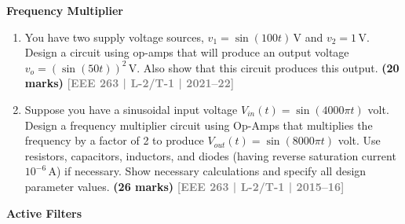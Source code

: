 \documentclass[12pt,a4paper]{article}
\newcommand{\yr}[1]{\hfill\textcolor{gray}{\small\textbf{[#1]}}}
\newcommand{\mk}[1]{\textcolor{orange!70!black}{\small\textbf{(#1 marks)}}}
\newcommand{\subtopic}[2]{%
  \vspace{10pt}
  \noindent\begin{tcolorbox}[colback=#1!8,colframe=#1,boxrule=0.6pt,arc=4pt,
    left=6pt,right=6pt,top=4pt,bottom=4pt]
    \small\bfseries\textcolor{#1}{#2}
  \end{tcolorbox}
  \vspace{2pt}
}
\begin{document}
\subtopic{cE}{Frequency Multiplier}
\label{sub:s7-freqmult}

\begin{enumerate}

\item You have two supply voltage sources, $v_1 = \sin(100t)\,\text{V}$ and $v_2 = 1\,\text{V}$. Design a circuit using op-amps that will produce an output voltage $v_o = (\sin(50t))^2\,\text{V}$. Also show that this circuit produces this output.
\mk{20} \yr{EEE 263 | L-2/T-1 | 2021--22}

\item Suppose you have a sinusoidal input voltage $V_{in}(t) = \sin(4000\pi t)$ volt. Design a frequency multiplier circuit using Op-Amps that multiplies the frequency by a factor of 2 to produce $V_{out}(t) = \sin(8000\pi t)$ volt. Use resistors, capacitors, inductors, and diodes (having reverse saturation current $10^{-6}\,\text{A}$) if necessary. Show necessary calculations and specify all design parameter values.
\mk{26} \yr{EEE 263 | L-2/T-1 | 2015--16}

\end{enumerate}

\subtopic{cE}{Active Filters}
\label{sub:s7-filters}
\end{document}
